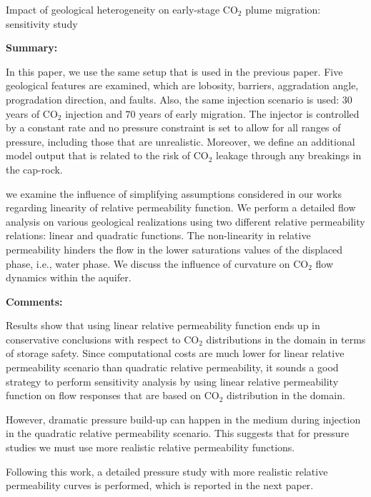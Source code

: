 %
%
{Impact of geological heterogeneity on early-stage $\mbox{CO}_2$ plume
migration: sensitivity study}
{%
\textbf{Summary:}

In this paper, we use the same setup that is used in the previous paper. Five
geological features are examined, which are lobosity, barriers, aggradation
angle, progradation direction, and faults. Also, the same injection scenario is
used: $30$ years of $\mbox{CO}_2$ injection and $70$ years of early migration.
The injector is controlled by a constant rate and no pressure constraint is set
to allow for all ranges of pressure, including those that are unrealistic.
Moreover, we define an additional model output that is related to the risk of
CO$_2$ leakage through any breakings in the cap-rock.

we examine the influence of simplifying assumptions considered in our works
regarding linearity of relative permeability function. We perform a detailed
flow analysis on various geological realizations using two different relative
permeability relations: linear and quadratic functions. The non-linearity in
relative permeability hinders the flow in the lower saturations values of the
displaced phase, i.e., water phase. We discuss the influence of curvature on
$\mbox{CO}_2$ flow dynamics within the aquifer.


\vspace{0.5cm}
\noindent\textbf{Comments:}

Results show that using linear relative permeability function ends up in
conservative conclusions with respect to $\mbox{CO}_2$ distributions in the
domain in terms of storage safety. Since computational costs are much lower for
linear relative permeability scenario than quadratic relative permeability, it
sounds a good strategy to perform sensitivity analysis by using linear relative
permeability function on flow responses that are based on $\mbox{CO}_2$
distribution in the domain.

However, dramatic pressure build-up can happen in the medium during injection
in the quadratic relative permeability scenario. This suggests that for
pressure studies we must use more realistic relative permeability functions.

Following this work, a detailed pressure study with more realistic relative
permeability curves is performed, which is reported in the next paper.

}%


